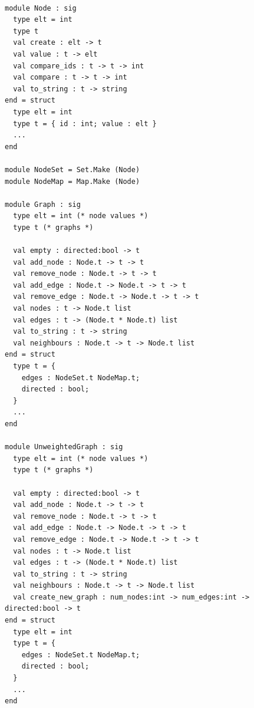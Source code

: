 \documentclass[mat1, tisk]{fmfdelo}
\begin{document}
\begin{lstlisting}

module Node : sig
  type elt = int
  type t
  val create : elt -> t
  val value : t -> elt
  val compare_ids : t -> t -> int
  val compare : t -> t -> int
  val to_string : t -> string
end = struct
  type elt = int
  type t = { id : int; value : elt }
  ...
end

module NodeSet = Set.Make (Node)
module NodeMap = Map.Make (Node)

module Graph : sig
  type elt = int (* node values *)
  type t (* graphs *)

  val empty : directed:bool -> t
  val add_node : Node.t -> t -> t
  val remove_node : Node.t -> t -> t
  val add_edge : Node.t -> Node.t -> t -> t
  val remove_edge : Node.t -> Node.t -> t -> t
  val nodes : t -> Node.t list
  val edges : t -> (Node.t * Node.t) list
  val to_string : t -> string
  val neighbours : Node.t -> t -> Node.t list
end = struct
  type t = {
    edges : NodeSet.t NodeMap.t;
    directed : bool;
  }
  ...
end

module UnweightedGraph : sig
  type elt = int (* node values *)
  type t (* graphs *)

  val empty : directed:bool -> t
  val add_node : Node.t -> t -> t
  val remove_node : Node.t -> t -> t
  val add_edge : Node.t -> Node.t -> t -> t
  val remove_edge : Node.t -> Node.t -> t -> t
  val nodes : t -> Node.t list
  val edges : t -> (Node.t * Node.t) list
  val to_string : t -> string
  val neighbours : Node.t -> t -> Node.t list
  val create_new_graph : num_nodes:int -> num_edges:int -> directed:bool -> t
end = struct
  type elt = int
  type t = {
    edges : NodeSet.t NodeMap.t;
    directed : bool;
  }
  ...
end

\end{lstlisting}
\end{document}
